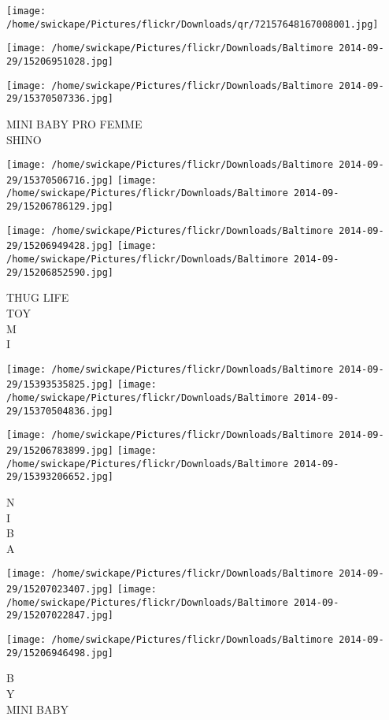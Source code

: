 \documentclass[10pt,letterpaper]{article}
\begin{document}
\texttt{[image: /home/swickape/Pictures/flickr/Downloads/qr/72157648167008001.jpg]}
\pagebreak

\texttt{[image: /home/swickape/Pictures/flickr/Downloads/Baltimore 2014-09-29/15206951028.jpg]}

\vspace{0.25in}
\texttt{[image: /home/swickape/Pictures/flickr/Downloads/Baltimore 2014-09-29/15370507336.jpg]}

MINI BABY PRO FEMME\\
SHINO
\pagebreak

\texttt{[image: /home/swickape/Pictures/flickr/Downloads/Baltimore 2014-09-29/15370506716.jpg]}
\texttt{[image: /home/swickape/Pictures/flickr/Downloads/Baltimore 2014-09-29/15206786129.jpg]}

\texttt{[image: /home/swickape/Pictures/flickr/Downloads/Baltimore 2014-09-29/15206949428.jpg]}
\texttt{[image: /home/swickape/Pictures/flickr/Downloads/Baltimore 2014-09-29/15206852590.jpg]}

THUG LIFE\\
TOY\\
M\\
I
\pagebreak

\texttt{[image: /home/swickape/Pictures/flickr/Downloads/Baltimore 2014-09-29/15393535825.jpg]}
\texttt{[image: /home/swickape/Pictures/flickr/Downloads/Baltimore 2014-09-29/15370504836.jpg]}

\texttt{[image: /home/swickape/Pictures/flickr/Downloads/Baltimore 2014-09-29/15206783899.jpg]}
\texttt{[image: /home/swickape/Pictures/flickr/Downloads/Baltimore 2014-09-29/15393206652.jpg]}

N\\
I\\
B\\
A
\pagebreak

\texttt{[image: /home/swickape/Pictures/flickr/Downloads/Baltimore 2014-09-29/15207023407.jpg]}
\texttt{[image: /home/swickape/Pictures/flickr/Downloads/Baltimore 2014-09-29/15207022847.jpg]}

\vspace{0.25in}
\texttt{[image: /home/swickape/Pictures/flickr/Downloads/Baltimore 2014-09-29/15206946498.jpg]}

B\\
Y\\
MINI BABY
\pagebreak
\end{document}

